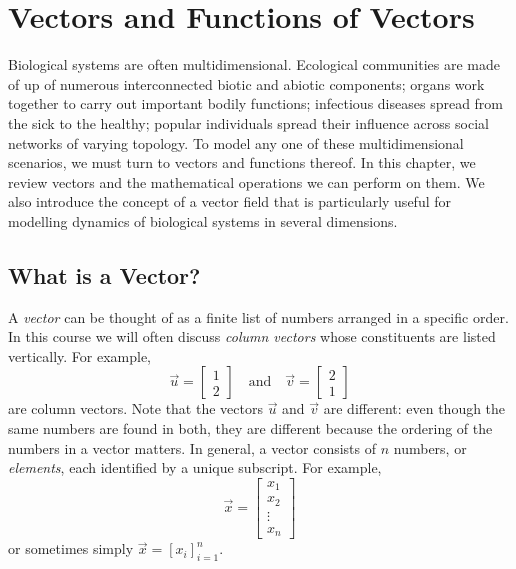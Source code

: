 \documentclass[../book.tex]{subfiles}
\begin{document}
\chapter{Vectors and Functions of Vectors}\label{ch:vec}

Biological systems are often multidimensional. Ecological communities are made of up of numerous interconnected biotic and abiotic components; organs work together to carry out important bodily functions; infectious diseases spread from the sick to the healthy; popular individuals spread their influence across social networks of varying topology. To model any one of these multidimensional scenarios, we must turn to vectors and functions thereof. In this chapter, we review vectors and the mathematical operations we can perform on them. We also introduce the concept of a vector field that is particularly useful for modelling dynamics of biological systems in several dimensions.

\section{What is a Vector?}

A \emph{vector} can be thought of as a finite list of numbers arranged in a specific order. In this course we will often discuss \emph{column vectors} whose constituents are listed vertically. For example,
\begin{equation}\label{eq:vec-1}
\vec{u} 
=
\begin{bmatrix}
  1 \\
  2 
\end{bmatrix}
\quad 
\text{and}
\quad
\vec{v} 
=
\begin{bmatrix}
  2 \\ 1
\end{bmatrix}
\end{equation}
are column vectors. Note that the vectors \(\vec{u}\) and \(\vec{v}\) are different: even though the same numbers are found in both, they are different because the ordering of the numbers in a vector matters. In general, a vector consists of \(n\) numbers, or \emph{elements}, each identified by a unique subscript. For example,
\begin{equation}\label{eq:vec-2}
\vec{x}
=
\begin{bmatrix}
  x_1 \\
  x_2 \\
  \vdots \\
  x_n
\end{bmatrix}	 
\end{equation}
or sometimes simply \(\vec{x} = [ x_{i} ]_{i=1}^n\).
\end{document}
